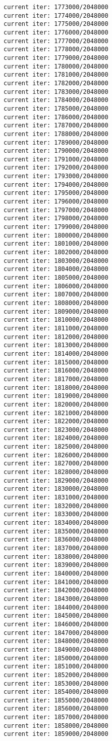 \documentclass[11pt]{article}
\begin{document}
\begin{Verbatim}[commandchars=\\\{\}]
current iter: 1773000/2048000
current iter: 1774000/2048000
current iter: 1775000/2048000
current iter: 1776000/2048000
current iter: 1777000/2048000
current iter: 1778000/2048000
current iter: 1779000/2048000
current iter: 1780000/2048000
current iter: 1781000/2048000
current iter: 1782000/2048000
current iter: 1783000/2048000
current iter: 1784000/2048000
current iter: 1785000/2048000
current iter: 1786000/2048000
current iter: 1787000/2048000
current iter: 1788000/2048000
current iter: 1789000/2048000
current iter: 1790000/2048000
current iter: 1791000/2048000
current iter: 1792000/2048000
current iter: 1793000/2048000
current iter: 1794000/2048000
current iter: 1795000/2048000
current iter: 1796000/2048000
current iter: 1797000/2048000
current iter: 1798000/2048000
current iter: 1799000/2048000
current iter: 1800000/2048000
current iter: 1801000/2048000
current iter: 1802000/2048000
current iter: 1803000/2048000
current iter: 1804000/2048000
current iter: 1805000/2048000
current iter: 1806000/2048000
current iter: 1807000/2048000
current iter: 1808000/2048000
current iter: 1809000/2048000
current iter: 1810000/2048000
current iter: 1811000/2048000
current iter: 1812000/2048000
current iter: 1813000/2048000
current iter: 1814000/2048000
current iter: 1815000/2048000
current iter: 1816000/2048000
current iter: 1817000/2048000
current iter: 1818000/2048000
current iter: 1819000/2048000
current iter: 1820000/2048000
current iter: 1821000/2048000
current iter: 1822000/2048000
current iter: 1823000/2048000
current iter: 1824000/2048000
current iter: 1825000/2048000
current iter: 1826000/2048000
current iter: 1827000/2048000
current iter: 1828000/2048000
current iter: 1829000/2048000
current iter: 1830000/2048000
current iter: 1831000/2048000
current iter: 1832000/2048000
current iter: 1833000/2048000
current iter: 1834000/2048000
current iter: 1835000/2048000
current iter: 1836000/2048000
current iter: 1837000/2048000
current iter: 1838000/2048000
current iter: 1839000/2048000
current iter: 1840000/2048000
current iter: 1841000/2048000
current iter: 1842000/2048000
current iter: 1843000/2048000
current iter: 1844000/2048000
current iter: 1845000/2048000
current iter: 1846000/2048000
current iter: 1847000/2048000
current iter: 1848000/2048000
current iter: 1849000/2048000
current iter: 1850000/2048000
current iter: 1851000/2048000
current iter: 1852000/2048000
current iter: 1853000/2048000
current iter: 1854000/2048000
current iter: 1855000/2048000
current iter: 1856000/2048000
current iter: 1857000/2048000
current iter: 1858000/2048000
current iter: 1859000/2048000

\end{Verbatim}
\end{document}

